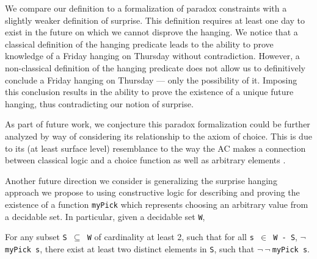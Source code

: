 \documentclass[runningheads]{llncs}
\newenvironment{myindent}{\begin{adjustwidth}{1cm}{}}{\end{adjustwidth}}
\begin{document}
We compare our definition to a formalization of paradox constraints with a slightly
weaker definition of surprise. This definition requires at least one day to
exist in the future on which we cannot disprove the hanging. We notice that a classical
definition of the hanging predicate leads to the ability to prove knowledge of a
Friday hanging on Thursday without contradiction. However, a non-classical
definition of the hanging predicate does not allow us to definitively conclude a Friday hanging
on Thursday --- only the possibility of it. Imposing this conclusion results in
the ability to prove the existence of a unique future hanging, thus contradicting
our notion of surprise.

As part of future work, we conjecture this paradox formalization could be further analyzed by way of considering its
relationship to the axiom of choice. This is due to its (at least surface level)
resemblance to the way the AC makes a connection between classical logic
and a choice function \cite{accomp} as well as arbitrary elements \cite{randomness}.

Another future direction we consider is generalizing the surprise hanging
approach we propose to using constructive logic for describing and proving
the existence of a function {\tt myPick}
which represents choosing an arbitrary value from a decidable set. In particular,
given a decidable set {\tt W}, \newline

\begin{myindent}
For any subset {\tt S $\subseteq$ W} of cardinality at least 2, such that for all
{\tt s $\in$ W - S}, $\neg ${\tt myPick s}, there exist at least two distinct
elements in {\tt S}, such that $\neg~\neg~${\tt myPick s}.
\end{myindent}
\end{document}
